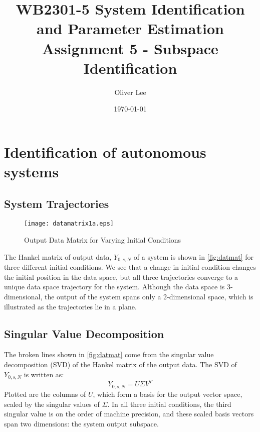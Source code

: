 \documentclass[11pt,a4paper]{article}
\title{WB2301-5 System Identification and Parameter Estimation \\
Assignment 5 - Subspace Identification}
\author{Oliver Lee}
\date{\today}
\begin{document}
\maketitle

\section{Identification of autonomous systems}

\subsection{System Trajectories}
\begin{figure}
    \centering
    \texttt{[image: datamatrix1a.eps]}
    \caption{Output Data Matrix for Varying Initial Conditions}
    \label{fig:datmat}
\end{figure}
The Hankel matrix of output data, $Y_{0,s,N}$ of a system is shown in
\autoref{fig:datmat} for three different initial conditions. We see that a
change in initial condition changes the initial position in the data space, but
all three trajectories converge to a unique data space trajectory for the
system.  Although the data space is 3-dimensional, the output of the system
spans only a 2-dimensional space, which is illustrated as the trajectories lie
in a plane.

\subsection{Singular Value Decomposition}
The broken lines shown in \autoref{fig:datmat} come from the singular value
decomposition (SVD) of the Hankel matrix of the output data. The SVD of
$Y_{0, s, N}$ is written as:
\begin{equation}
    \label{eq:svd}
    Y_{0, s, N} = U \Sigma V^T
\end{equation}
Plotted are the columns of $U$, which form a basis for the output vector space,
scaled by the singular values of $\Sigma$. In all three initial conditions, the
third singular value is on the order of machine precision, and these scaled
basis vectors span two dimensions: the system output subspace.

\end{document}
